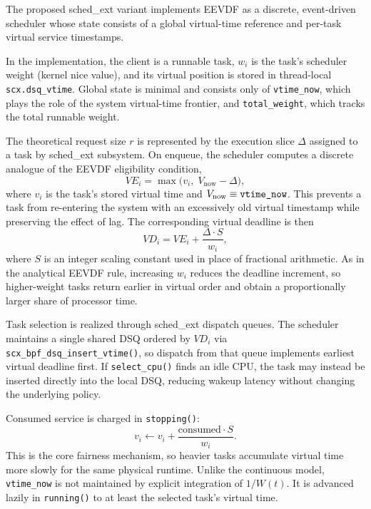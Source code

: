 \documentclass[a4paper]{article}
\begin{document}
\enlargethispage{-1\baselineskip}
The proposed sched\_ext variant implements EEVDF as a discrete, event-driven scheduler
whose state consists of a global virtual-time reference and per-task virtual
service timestamps.

In the implementation, the client is a runnable task,
$ w_i $ is the task's scheduler weight (kernel nice value), and its virtual
position is stored in thread-local \verb|scx.dsq_vtime|.
Global state is minimal and consists only of \verb|vtime_now|, which plays
the role of the system virtual-time frontier, and \verb|total_weight|, which 
tracks the total runnable weight.

The theoretical request size $ r $ is represented by the execution slice
$ \Delta $ assigned to a task by sched\_ext subsystem.
On enqueue, the scheduler computes a discrete analogue of the EEVDF eligibility
condition,
\begin{equation}
    VE_i = \max\bigl(v_i,\; V_{\mathrm{now}} - \Delta\bigr),
\end{equation}
where $ v_i $ is the task's stored virtual time and
$ V_{\mathrm{now}} \equiv \verb|vtime_now| $.
This prevents a task from re-entering the system with an excessively old
virtual timestamp while preserving the effect of lag.
The corresponding virtual deadline is then
\begin{equation}
    VD_i = VE_i + \frac{\Delta \cdot S}{w_i},
\end{equation}
where $ S $ is an integer scaling constant used in place of fractional
arithmetic.
As in the analytical EEVDF rule, increasing $ w_i $ reduces the deadline
increment, so higher-weight tasks return earlier in virtual order and obtain a
proportionally larger share of processor time.

Task selection is realized through sched\_ext dispatch queues.
The scheduler maintains a single shared DSQ ordered by $ VD_i $ via\\
\verb|scx_bpf_dsq_insert_vtime()|, so dispatch from that queue implements
earliest virtual deadline first.
If \verb|select_cpu()| finds an idle CPU, the task may instead be inserted
directly into the local DSQ, reducing wakeup latency without changing the
underlying policy.

Consumed service is charged in \verb|stopping()|:
\begin{equation}
    v_i \leftarrow v_i + \frac{\mathrm{consumed}\cdot S}{w_i}.
\end{equation}
This is the core fairness mechanism, so heavier tasks accumulate virtual time more
slowly for the same physical runtime.
Unlike the continuous model, \verb|vtime_now| is not maintained by explicit
integration of $ 1/W(t) $. It is advanced lazily in \verb|running()| to at least
the selected task's virtual time.
\end{document}
